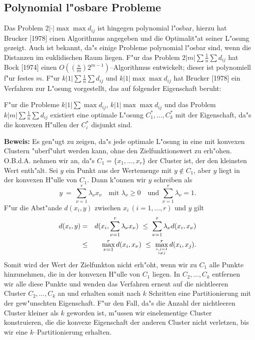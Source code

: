 \subsection{Polynomial l"osbare Probleme}
Das Problem $2|\cdot| \max \max d_{ij}$ ist hingegen polynomial l"osbar, 
hierzu hat Brucker [1978] einen Algorithmus angegeben und die Optimalit"at
seiner L"osung gezeigt.
Auch ist bekannt, da"s einige Probleme polynomial l"osbar sind, wenn 
die Distanzen im euklidischen Raum liegen. F"ur das Problem
$2|m|\sum \frac 1n \sum d_{ij}$ hat Bock [1974]
einen $O((\frac nm) 2^{m-1})$--Algorithmus entwickelt; dieser ist
polynomiell f"ur festes $m$.
F"ur $k|1|\sum \frac 1n \sum d_{ij}$ und
$k|1|\max \max d_{ij}$ hat Brucker [1978] ein Verfahren
zur L"osung vorgestellt, das auf folgender Eigenschaft beruht:


\begin{satz}
\label{satzdisjunkt}
F"ur die Probleme $k|1| \sum \max d_{ij}$,
$k|1| \max \max d_{ij}$ 
und das Problem $k|m|\sum \frac 1n \sum d_{ij}$ 
existiert eine optimale L"osung
$C_1^*,\dots,C_k^*$ mit der Eigenschaft, da"s die konvexen H"ullen
der $C_i^*$ disjunkt sind.
\end{satz}
{\bf Beweis: }
Es gen"ugt zu zeigen, da"s jede optimale L"osung in eine mit konvexen
Clustern "uberf"uhrt werden kann, ohne den Zielfunktionswert zu
erh"ohen. O.B.d.A. nehmen wir an, da"s $C_1 = \{x_1,\dots,x_r\}$ 
der Cluster ist, der den kleinsten Wert enth"alt. Sei $y$ ein Punkt
aus der Wertemenge mit $y \not\in C_1$, aber $y$ liegt in der konvexen
H"ulle von $C_1$. Dann k"onnen wir $y$ schreiben als
\[ y \ = \ \sum_{\nu = 1}^r \lambda_\nu x_\nu \quad \mbox{mit }
	\lambda_\nu \geq 0\quad \mbox{und } \sum_{\nu = 1}^r \lambda_\nu =1.\]
F"ur die Abst"ande $d(x_i,y)$ zwischen $x_i\,(i=1,\dots,r)$ und $y$ gilt
\begin{eqnarray*}
 d(x_i,y)   & = & d(x_i,\sum_{\nu=1}^r \lambda_\nu x_\nu)
	        \ \leq \ \sum_{\nu = 1}^r \lambda_\nu d(x_i,x_\nu)\\
			& \leq & \max_{\nu = 1}^r d(x_i,x_\nu)
			\ \leq \ \max_{i,j = 1 \atop i \neq j}^r d(x_i,x_j).
\end{eqnarray*}
Somit wird der Wert der Zielfunkton nicht erh"oht, wenn wir zu $C_1$ alle
Punkte hinzunehmen, die in der konvexen H"ulle von $C_1$ liegen. In 
$C_2,\dots,C_k$ entfernen wir alle diese Punkte und wenden das Verfahren
erneut auf die nichtleeren Cluster $C_2,\dots,C_k$ an und erhalten somit
nach $k$ Schritten eine Partitionierung mit der gew"unschten 
Eigenschaft. F"ur den Fall, da"s die Anzahl der nichtleeren Cluster
kleiner als $k$ geworden ist, m"ussen wir 
einelementige Cluster konstruieren, die die konvexe Eigenschaft der
anderen Cluster nicht verletzen,
bis wir eine $k$--Partitionierung erhalten.

